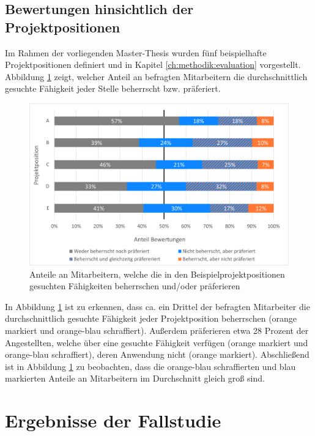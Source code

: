 \subsection{Bewertungen hinsichtlich der Projektpositionen}
\label{ch:ergebnisse:analyse:projektpositionen}
Im Rahmen der vorliegenden Master-Thesis wurden fünf beispielhafte Projektpositionen definiert und in Kapitel \ref{ch:methodik:evaluation} vorgestellt. Abbildung \ref{fig:ergebnisse:analyse:abb5} zeigt, welcher Anteil an befragten Mitarbeitern die durchschnittlich gesuchte Fähigkeit jeder Stelle beherrscht bzw. präferiert.

\begin{figure}[h]
	\centering
	\includegraphics[width=1\textwidth]{gfx/anteil-bewertungen-je-projektposition.png}
	\caption{Anteile an Mitarbeitern, welche die in den Beispielprojektpositionen gesuchten Fähigkeiten beherrschen und/oder präferieren}
	\label{fig:ergebnisse:analyse:abb5}
\end{figure}

In Abbildung \ref{fig:ergebnisse:analyse:abb5} ist zu erkennen, dass ca. ein Drittel der befragten Mitarbeiter die durchschnittlich gesuchte Fähigkeit jeder Projektposition beherrschen (orange markiert und orange-blau schraffiert). Außerdem präferieren etwa 28 Prozent der Angestellten, welche über eine gesuchte Fähigkeit verfügen (orange markiert und orange-blau schraffiert), deren Anwendung nicht (orange markiert). Abschließend ist in Abbildung \ref{fig:ergebnisse:analyse:abb5} zu beobachten, dass die orange-blau schraffierten und blau markierten Anteile an Mitarbeitern im Durchschnitt gleich groß sind.

\newpage
\section{Ergebnisse der Fallstudie}
\label{ch:ergebnisse:fallstudie}

